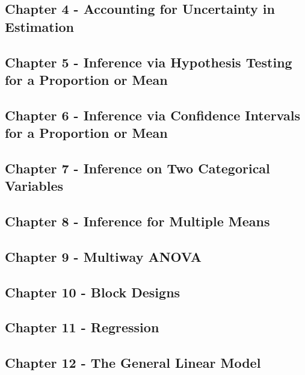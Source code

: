 \documentclass[]{book}
\begin{document}
\subsection{Chapter 4 - Accounting for Uncertainty in
Estimation}\label{chapter-4---accounting-for-uncertainty-in-estimation}

\subsection{Chapter 5 - Inference via Hypothesis Testing for a
Proportion or
Mean}\label{chapter-5---inference-via-hypothesis-testing-for-a-proportion-or-mean}

\subsection{Chapter 6 - Inference via Confidence Intervals for a
Proportion or
Mean}\label{chapter-6---inference-via-confidence-intervals-for-a-proportion-or-mean}

\subsection{Chapter 7 - Inference on Two Categorical
Variables}\label{chapter-7---inference-on-two-categorical-variables}

\subsection{Chapter 8 - Inference for Multiple
Means}\label{chapter-8---inference-for-multiple-means}

\subsection{Chapter 9 - Multiway
ANOVA}\label{chapter-9---multiway-anova}

\subsection{Chapter 10 - Block
Designs}\label{chapter-10---block-designs}

\subsection{Chapter 11 - Regression}\label{chapter-11---regression}

\subsection{Chapter 12 - The General Linear
Model}\label{chapter-12---the-general-linear-model}
\end{document}
